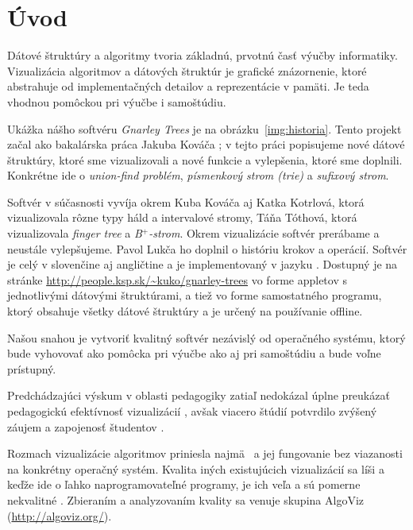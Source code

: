 \cleardoublepage
{}
\chapter*{Úvod}\label{chap:intro}

Dátové štruktúry a algoritmy tvoria základnú, prvotnú časť výučby 
informatiky. Vizualizácia algoritmov a dátových štruktúr je grafické 
znázornenie, ktoré abstrahuje od implementačných detailov a reprezentácie
v pamäti. Je teda vhodnou pomôckou pri výučbe i samoštúdiu. 

Ukážka nášho softvéru \emph{Gnarley Trees} je na obrázku~\ref{img:historia}.
Tento projekt začal ako bakalárska práca Jakuba Kováča \citep{kuko};
v tejto práci popisujeme nové dátové štruktúry, ktoré sme vizualizovali
a nové funkcie a vylepšenia, ktoré sme doplnili. Konkrétne ide o 
\emph{union-find problém}, \emph{písmenkový strom (trie)} a 
\emph{sufixový strom}. 

Softvér v súčasnosti vyvíja okrem Kuba Kováča aj Katka Kotrlová, ktorá 
vizualizovala rôzne typy háld a intervalové stromy, Táňa Tóthová, ktorá 
vizualizovala \emph{finger tree} a \emph{B$^+$-strom}.
Okrem vizualizácie softvér prerábame a neustále vylepšujeme.
Pavol Lukča ho doplnil o históriu krokov a operácií. Softvér je celý v 
slovenčine aj angličtine a je 
implementovaný v jazyku \Java. Dostupný je na stránke
{\url{http://people.ksp.sk/~kuko/gnarley-trees}} vo forme appletov
s jednotlivými dátovými štruktúrami, a tiež vo forme samostatného programu,
ktorý obsahuje všetky dátové štruktúry a je určený na používanie offline.

Našou snahou je vytvoriť kvalitný softvér nezávislý od operačného systému, 
ktorý bude vyhovovať ako pomôcka pri výučbe ako aj pri samoštúdiu a bude
voľne prístupný. 

Predchádzajúci výskum v oblasti pedagogiky
zatiaľ nedokázal úplne preukázať pedagogickú efektívnosť
vizualizácií \citep{shaffer}, avšak viacero štúdií potvrdilo zvýšený záujem
a zapojenosť študentov \citep{naps02, hundhausen02}.

Rozmach vizualizácie algoritmov priniesla najmä \Java\ a jej fungovanie 
bez viazanosti na konkrétny operačný systém. Kvalita iných existujúcich 
vizualizácií sa líši a keďže ide o ľahko naprogramovateľné programy, je ich 
veľa a sú pomerne nekvalitné \citep{shaffer}. 
Zbieraním a analyzovaním kvality sa venuje skupina AlgoViz (\hbox{\url{http://algoviz.org/}}).

